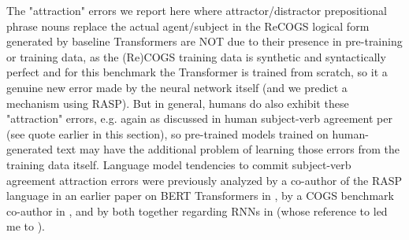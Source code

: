 \documentclass[11pt]{article}
\begin{document}
The "attraction" errors we report here where attractor/distractor prepositional phrase nouns replace the actual agent/subject in the ReCOGS logical form generated by \citep{Wu2023} baseline Transformers are NOT due to their presence in pre-training or training data, as the (Re)COGS training data is synthetic and syntactically perfect and for this benchmark the Transformer is trained from scratch, so it a genuine new error made by the neural network itself (and we predict a mechanism using RASP). But in general, humans do also exhibit these "attraction" errors, e.g. again as discussed in human subject-verb agreement per \citep{jespersen1913modernenglishgrammar1954reprint} (see quote earlier in this section), so pre-trained models trained on human-generated text may have the additional problem of learning those errors from the training data itself. Language model tendencies to commit subject-verb agreement attraction errors were previously analyzed by a co-author of the RASP language in an earlier paper on BERT Transformers in \citep{goldberg2019assessingbertssyntacticabilities}, by a COGS benchmark co-author in \citep{vanschijndel2019quantitydoesntbuyquality}, and by both together regarding RNNs in \citep{linzen2016assessing} (whose reference to \citep{agreementwithnearestlanguagelog} led me to \citep{jespersen1913modernenglishgrammar1954reprint}).
\end{document}
